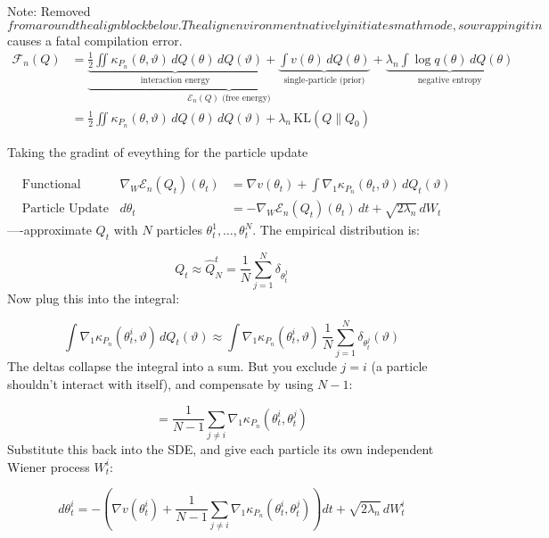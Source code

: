 \documentclass[11pt,a4paper]{article}
\newcommand{\add}[1]{{\color{red}#1}}
\begin{document}
\add{Note: Removed $$ from around the align block below. The align environment natively initiates math mode, so wrapping it in $$ causes a fatal compilation error.}
\begin{align}
\mathcal{F}_n(Q) &= \underbrace{ \underbrace{\frac{1}{2} \iint \kappa_{P_n}(\theta, \vartheta) \, dQ(\theta) \, dQ(\vartheta)}_{\text{interaction energy}} + \underbrace{\int v(\theta) \, dQ(\theta)}_{\text{single-particle (prior)}} }_{\mathcal{E}_n(Q) \text{ (free energy)}} + \underbrace{\lambda_n \int \log q(\theta) \, dQ(\theta)}_{\text{negative entropy}}  \\

 &= \frac{1}{2}\iint \kappa_{P_n}(\theta, \vartheta)\, dQ(\theta)\, dQ(\vartheta) + \lambda_n\, \text{KL}(Q \| Q_0)

\end{align}

Taking the gradint of eveything for the particle update

$$
\begin{aligned}
    &\text{Functional Gradient:} \quad &\nabla_W \mathcal{E}_n(Q_t)(\theta_t) &= \nabla v(\theta_t) + \int \nabla_1 \kappa_{P_n}(\theta_t, \vartheta) \, dQ_t(\vartheta) \\[12pt]
    &\text{Particle Update (SDE):} \quad &d\theta_t &= -\nabla_W \mathcal{E}_n(Q_t)(\theta_t) \, dt + \sqrt{2\lambda_n} \, dW_t
\end{aligned}$$
----approximate $Q_t$ with $N$ particles $\theta^1_t, \dots, \theta^N_t$. The empirical distribution is:


$$Q_t \approx \hat{Q}^t_N = \frac{1}{N}\sum_{j=1}^N \delta_{\theta^j_t}$$
Now plug this into the integral:


$$\int \nabla_1 \kappa_{P_n}(\theta^i_t, \vartheta) \, dQ_t(\vartheta) \approx \int \nabla_1 \kappa_{P_n}(\theta^i_t, \vartheta) \, \frac{1}{N}\sum_{j=1}^N \delta_{\theta^j_t}(\vartheta)$$
The deltas collapse the integral into a sum. But you exclude $j = i$ (a particle shouldn't interact with itself), and compensate by using $N-1$:


$$= \frac{1}{N-1}\sum_{j \neq i} \nabla_1 \kappa_{P_n}(\theta^i_t, \theta^j_t)$$
Substitute this back into the SDE, and give each particle its own independent Wiener process $W^i_t$:


$$d\theta^i_t = -\left(\nabla v(\theta^i_t) + \frac{1}{N-1}\sum_{j \neq i} \nabla_1 \kappa_{P_n}(\theta^i_t, \theta^j_t)\right) dt + \sqrt{2\lambda_n} \, dW^i_t$$
\end{document}
